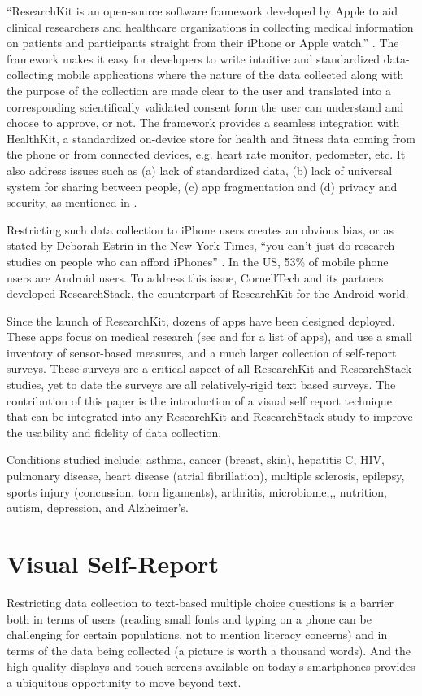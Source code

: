 \documentclass{acm_proc_article-sp}
\begin{document}
``ResearchKit is an open-source software framework developed by Apple to aid clinical researchers and healthcare organizations in collecting medical information on patients and participants straight from their iPhone or Apple watch.'' \cite{Bionetworks_undated-yw}. The framework makes it easy for developers to write intuitive and standardized data-collecting mobile applications where the nature of the data collected along with the purpose of the collection are made clear to the user and translated into a corresponding scientifically validated consent form the user can understand and choose to approve, or not. The framework provides a seamless integration with HealthKit, a standardized on-device store for health and fitness data coming from the phone or from connected devices, e.g. heart rate monitor, pedometer, etc.
It also address issues such as (a) lack of standardized data, (b) lack of universal system for sharing between people, (c) app fragmentation and (d) privacy and security, as mentioned in \cite{noauthor_undated-ej}.

Restricting such data collection to iPhone users creates an obvious bias, or as stated by Deborah Estrin in the New York Times,  ``you can't just do research studies on people who can afford iPhones'' \cite{Apple_undated-rz}. In the US, 53\% of mobile phone users are Android users.
To address this issue, CornellTech and its partners developed ResearchStack, the counterpart of ResearchKit for the Android world. 

Since the launch of ResearchKit, dozens of apps have been designed deployed. These apps focus on medical research (see \cite{noauthor_undated-xa} and \cite{Tangmunarunkit2015-hu} for a list of apps), and use a small inventory of sensor-based measures, and a much larger collection of self-report surveys. These surveys are a critical aspect of all ResearchKit and ResearchStack studies, yet to date the surveys are all relatively-rigid text based surveys.   The contribution of this paper is the introduction of a visual self report technique that can be integrated into any ResearchKit and ResearchStack study to improve the usability and fidelity of data collection.

Conditions studied include: asthma, cancer (breast, skin), hepatitis C, HIV, pulmonary disease, heart disease (atrial fibrillation), multiple sclerosis, epilepsy, sports injury (concussion, torn ligaments), arthritis, microbiome,,, nutrition, autism, depression, and Alzheimer's.


\section{Visual Self-Report}
Restricting data collection to text-based multiple choice questions is a barrier both in terms of users (reading small fonts and typing on a phone can be challenging for certain populations, not to mention literacy concerns) and in terms of the data being collected (a picture is worth a thousand words). And the high quality displays and touch screens  available on today's smartphones provides a ubiquitous opportunity to move beyond text.
\end{document}
